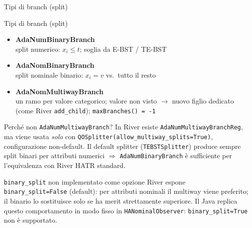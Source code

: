 \documentclass[aspectratio=169,10pt]{beamer}
\begin{document}
\begin{frame}{Tipi di branch (split)}

\vspace{-0.5em}

\begin{block}{Tipi di branch (split)}
  \begin{itemize}\small
    \item \textbf{AdaNumBinaryBranch}\\
          \footnotesize split numerico: $x_i \le t$;
          soglia da E-BST / TE-BST
    \medskip

    \item \textbf{AdaNomBinaryBranch}\\
          \footnotesize split nominale binario:
          $x_i = v$ vs.\ tutto il resto
    \medskip

    \item \textbf{AdaNomMultiwayBranch}\\
          \footnotesize un ramo per valore categorico;
          valore non visto $\to$ nuovo figlio dedicato
          (come River \texttt{add\_child});
          \texttt{maxBranches() = -1}
  \end{itemize}
\end{block}

\vspace{-0.8em}

\medskip
\begin{alertblock}{Perché non \texttt{AdaNumMultiwayBranch}?}
  \footnotesize
  In River esiste \texttt{AdaNumMultiwayBranchReg}, ma viene usata
  \emph{solo} con \texttt{QOSplitter(allow\_multiway\_splits=True)},
  configurazione non-default. Il default splitter (\texttt{TEBSTSplitter})
  produce sempre split binari per attributi numerici
  $\Rightarrow$ \texttt{AdaNumBinaryBranch} è sufficiente per
  l'equivalenza con River HATR standard.
\end{alertblock}

\vspace{-0.8em}

\medskip
\begin{alertblock}{\texttt{binary\_split} non implementato come opzione}
  \footnotesize
  River espone \texttt{binary\_split=False} (default): per attributi
  nominali il multiway viene preferito; il binario lo sostituisce solo
  se ha merit strettamente superiore.
  Il Java replica questo comportamento in modo fisso in
  \texttt{HANominalObserver}: \texttt{binary\_split=True} non è
  supportato.
\end{alertblock}

\end{frame}
\end{document}
